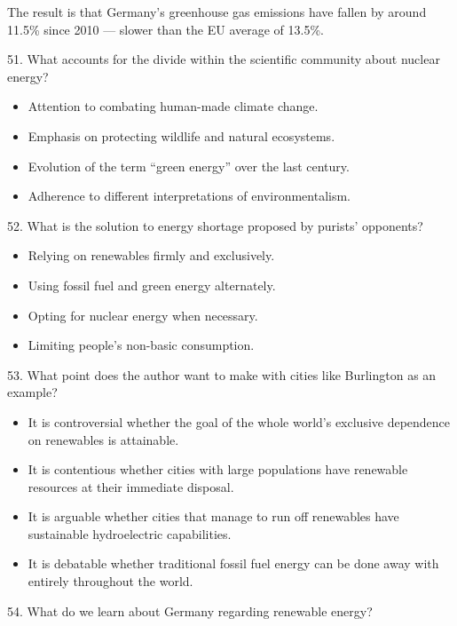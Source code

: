 \documentclass[UTF8,11pt]{ctexart}
\begin{document}
The result is that Germany’s greenhouse gas emissions have fallen by around 11.5\% since 2010 — slower than the EU average of 13.5\%.


51. What accounts for the divide within the scientific community about nuclear energy?


\begin{itemize}[leftmargin=2em,itemsep=.2em,topsep=.4em]\item[A.] Attention to combating human-made climate change.
\item[B.] Emphasis on protecting wildlife and natural ecosystems.
\item[C.] Evolution of the term “green energy” over the last century.
\item[D.] Adherence to different interpretations of environmentalism.
\end{itemize}

52. What is the solution to energy shortage proposed by purists’ opponents?


\begin{itemize}[leftmargin=2em,itemsep=.2em,topsep=.4em]\item[A.] Relying on renewables firmly and exclusively.
\item[B.] Using fossil fuel and green energy alternately.
\item[C.] Opting for nuclear energy when necessary.
\item[D.] Limiting people’s non-basic consumption.
\end{itemize}

53. What point does the author want to make with cities like Burlington as an example?


\begin{itemize}[leftmargin=2em,itemsep=.2em,topsep=.4em]\item[A.] It is controversial whether the goal of the whole world’s exclusive dependence on renewables is attainable.
\item[B.] It is contentious whether cities with large populations have renewable resources at their immediate disposal.
\item[C.] It is arguable whether cities that manage to run off renewables have sustainable hydroelectric capabilities.
\item[D.] It is debatable whether traditional fossil fuel energy can be done away with entirely throughout the world.
\end{itemize}

54. What do we learn about Germany regarding renewable energy?
\end{document}
